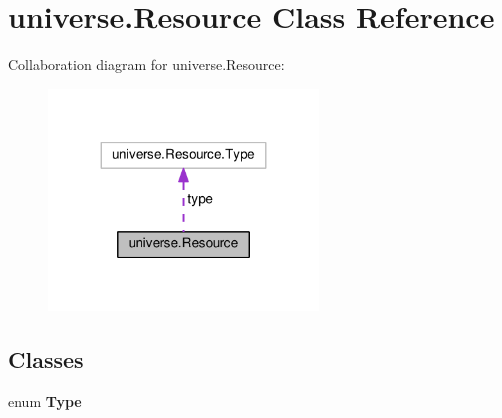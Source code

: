 \hypertarget{classuniverse_1_1_resource}{}\section{universe.\+Resource Class Reference}
\label{classuniverse_1_1_resource}


Collaboration diagram for universe.\+Resource\+:\nopagebreak
\begin{figure}[H]
\begin{center}
\leavevmode
\includegraphics[width=203pt]{classuniverse_1_1_resource__coll__graph}
\end{center}
\end{figure}
\subsection*{Classes}
\begin{DoxyCompactItemize}
\item 
enum {\bfseries Type}
\end{DoxyCompactItemize}
